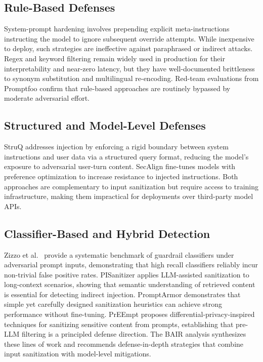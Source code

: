 \documentclass[10pt,conference]{IEEEtran}
\begin{document}
\subsection{Rule-Based Defenses}

System-prompt hardening \cite{mend2024prompt} involves prepending
explicit meta-instructions instructing the model to ignore subsequent
override attempts.
While inexpensive to deploy, such strategies are ineffective against
paraphrased or indirect attacks.
Regex and keyword filtering remain widely used in production
\cite{getstream2024prompt} for their interpretability and near-zero
latency, but they have well-documented brittleness to synonym
substitution and multilingual re-encoding.
Red-team evaluations from Promptfoo \cite{promptfoo2024owasp} confirm
that rule-based approaches are routinely bypassed by moderate
adversarial effort.

\subsection{Structured and Model-Level Defenses}

StruQ \cite{struq2024} addresses injection by enforcing a rigid
boundary between system instructions and user data via a structured
query format, reducing the model's exposure to adversarial
user-turn content.
SecAlign \cite{secalign2024} fine-tunes models with preference
optimization to increase resistance to injected instructions.
Both approaches are complementary to input sanitization but require
access to training infrastructure, making them impractical for
deployments over third-party model APIs.

\subsection{Classifier-Based and Hybrid Detection}

Zizzo et al.\ \cite{zizzo2025adversarial} provide a systematic
benchmark of guardrail classifiers under adversarial prompt inputs,
demonstrating that high recall classifiers reliably incur non-trivial
false positive rates.
PISanitizer \cite{geng2025pisanitizer} applies LLM-assisted
sanitization to long-context scenarios, showing that semantic
understanding of retrieved content is essential for detecting indirect
injection.
PromptArmor \cite{shi2025promptarmor} demonstrates that simple
yet carefully designed sanitization heuristics can achieve strong
performance without fine-tuning.
PrEEmpt \cite{chowdhury2025prepsilonepsilonmptsanitizingsensitiveprompts}
proposes differential-privacy-inspired techniques for sanitizing
sensitive content from prompts, establishing that pre-LLM filtering
is a principled defense direction.
The BAIR analysis \cite{bair2025prompt} synthesizes these lines of
work and recommends defense-in-depth strategies that combine
input sanitization with model-level mitigations.
\end{document}
